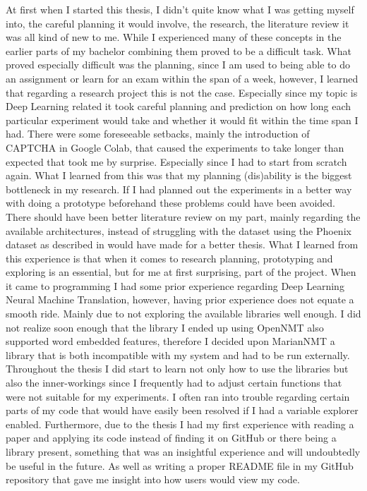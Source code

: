 At first when I started this thesis, I didn't quite know what I was getting myself into, the careful planning it would involve, the research, the literature review it was all kind of new to me. While I experienced many of these concepts in the earlier parts of my bachelor combining them proved to be a difficult task. What proved especially difficult was the planning, since I am used to being able to do an assignment or learn for an exam within the span of a week, however, I learned that regarding a research project this is not the case. Especially since my topic is Deep Learning related it took careful planning and prediction on how long each particular experiment would take and whether it would fit within the time span I had. There were some foreseeable setbacks, mainly the introduction of CAPTCHA in Google Colab, that caused the experiments to take longer than expected that took me by surprise. Especially since I had to start from scratch again. What I learned from this was that my planning (dis)ability is the biggest bottleneck in my research. If I had planned out the experiments in a better way with doing a prototype beforehand these problems could have been avoided. There should have been better literature review on my part, mainly regarding the available architectures, instead of struggling with the dataset using the Phoenix dataset as described in \cite{camgoz2018neural} would have made for a better thesis. What I learned from this experience is that when it comes to research planning, prototyping and exploring is an essential, but for me at first surprising, part of the project.
When it came to programming I had some prior experience regarding Deep Learning Neural Machine Translation, however, having prior experience does not equate a smooth ride. Mainly due to not exploring the available libraries well enough. I did not realize soon enough that the library I ended up using OpenNMT \cite{klein-etal-2017-opennmt} also supported word embedded features, therefore I decided upon MarianNMT \cite{mariannmt} a library that is both incompatible with my system and had to be run externally. Throughout the thesis I did start to learn not only how to use the libraries but also the inner-workings since I frequently had to adjust certain functions that were not suitable for my experiments. I often ran into trouble regarding certain parts of my code that would have easily been resolved if I had a variable explorer enabled. Furthermore, due to the thesis I had my first experience with reading a paper and applying its code instead of finding it on GitHub or there being a library present, something that was an insightful experience and will undoubtedly be useful in the future. As well as writing a proper README file in my GitHub repository \cite{gijsgithub} that gave me insight into how users would view my code.
